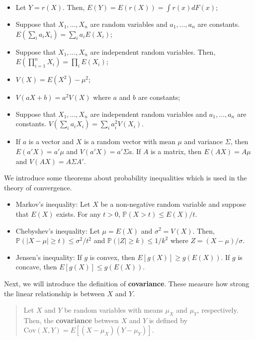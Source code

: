 \documentclass[
  12pt,
]{article}
\providecommand{\tightlist}{%
  \setlength{\itemsep}{0pt}\setlength{\parskip}{0pt}}
\begin{document}
\begin{itemize}
\tightlist
\item
  Let \(Y = r(X)\). Then, \(E(Y) = E(r(X)) = \int r(x) dF(x)\);
\item
  Suppose that \(X_1, \ldots, X_n\) are random variables and \(a_1, \ldots, a_n\) are constants. \(E(\sum_i a_i X_i) = \sum_i a_i E(X_i)\);
\item
  Suppose that \(X_1, \ldots, X_n\) are independent random variables. Then, \(E(\prod_{i=1}^n X_i) = \prod_i E(X_i)\);
\item
  \(V(X) = E(X^2) - \mu^2\);
\item
  \(V(aX + b) = a^2 V(X)\) where \(a\) and \(b\) are constants;
\item
  Suppose that \(X_1, \ldots, X_n\) are independent random variables and \(a_1, \ldots, a_n\) are constants. \(V(\sum_i a_i X_i) = \sum_i a_i^2 V(X_i)\).
\item
  If \(a\) is a vector and \(X\) is a random vector with mean \(\mu\) and variance \(\Sigma\), then \(E(a'X) = a'\mu\) and \(V(a'X) = a'\Sigma a\). If \(A\) is a matrix, then \(E(AX) = A\mu\) and \(V(AX) = A\Sigma A'\).
\end{itemize}

We introduce some theorems about probability inequalities which is used in the theory of convergence.

\begin{itemize}
\tightlist
\item
  Markov's inequality: Let \(X\) be a non-negative random variable and suppose that \(E(X)\) exists. For any \(t > 0\), \(\mathbb{P}(X > t) \le E(X)/t\).
\item
  Chebyshev's inequality: Let \(\mu = E(X)\) and \(\sigma^2 = V(X)\). Then, \(\mathbb{P}(|X - \mu| \ge t) \le \sigma^2/t^2\) and \(\mathbb{P}(|Z| \ge k) \le 1/k^2\) where \(Z = (X - \mu)/\sigma\).
\item
  Jensen's inequality: If \(g\) is convex, then \(E[ g(X) ] \ge g(E(X))\). If \(g\) is concave, then \(E[ g(X) ] \le g(E(X))\).
\end{itemize}

Next, we will introduce the definition of \textbf{covariance}. These measure how strong the linear relationship is between \(X\) and \(Y\).

\begin{quote}
Let \(X\) and \(Y\) be random variables with means \(\mu_X\) and \(\mu_Y\), respectively. Then, the \textbf{covariance} between \(X\) and \(Y\) is defined by \(\mathrm{Cov}(X, Y) = E[(X - \mu_X)(Y - \mu_Y)]\).
\end{quote}
\end{document}
